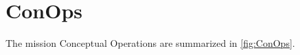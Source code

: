 \section{ConOps}
\label{sec:conops}

The mission Conceptual Operations are summarized in \autoref{fig:ConOps}.

